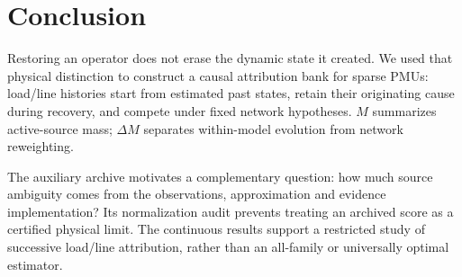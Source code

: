 \section{Conclusion}
\label{sec:conclusion}

Restoring an operator does not erase the dynamic state it created. We used
that physical distinction to construct a causal attribution bank for sparse
PMUs: load/line histories start from estimated past states, retain their
originating cause during recovery, and compete under fixed network
hypotheses. $M$ summarizes active-source mass; $\Delta M$ separates
within-model evolution from network reweighting.

The auxiliary archive motivates a complementary question: how much source
ambiguity comes from the observations, approximation and evidence implementation?
Its normalization audit prevents treating an archived score as a certified
physical limit. The continuous results support a restricted study of successive load/line
attribution, rather than an all-family or universally optimal estimator.
